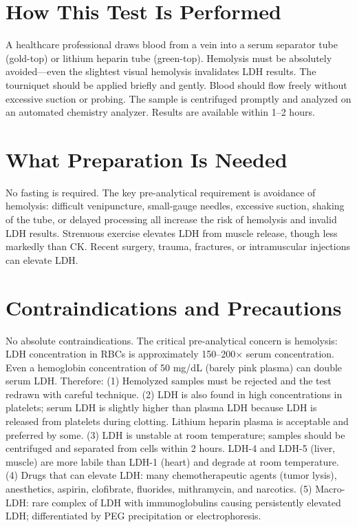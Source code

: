 \section*{How This Test Is Performed}
A healthcare professional draws blood from a vein into a serum separator tube (gold-top) or lithium heparin tube (green-top). Hemolysis must be absolutely avoided---even the slightest visual hemolysis invalidates LDH results. The tourniquet should be applied briefly and gently. Blood should flow freely without excessive suction or probing. The sample is centrifuged promptly and analyzed on an automated chemistry analyzer. Results are available within 1--2 hours.

\section*{What Preparation Is Needed}
No fasting is required. The key pre-analytical requirement is avoidance of hemolysis: difficult venipuncture, small-gauge needles, excessive suction, shaking of the tube, or delayed processing all increase the risk of hemolysis and invalid LDH results. Strenuous exercise elevates LDH from muscle release, though less markedly than CK. Recent surgery, trauma, fractures, or intramuscular injections can elevate LDH.

\section*{Contraindications and Precautions}
No absolute contraindications. The critical pre-analytical concern is hemolysis: LDH concentration in RBCs is approximately 150--200$\times$ serum concentration. Even a hemoglobin concentration of 50 mg/dL (barely pink plasma) can double serum LDH. Therefore: (1) Hemolyzed samples must be rejected and the test redrawn with careful technique. (2) LDH is also found in high concentrations in platelets; serum LDH is slightly higher than plasma LDH because LDH is released from platelets during clotting. Lithium heparin plasma is acceptable and preferred by some. (3) LDH is unstable at room temperature; samples should be centrifuged and separated from cells within 2 hours. LDH-4 and LDH-5 (liver, muscle) are more labile than LDH-1 (heart) and degrade at room temperature. (4) Drugs that can elevate LDH: many chemotherapeutic agents (tumor lysis), anesthetics, aspirin, clofibrate, fluorides, mithramycin, and narcotics. (5) Macro-LDH: rare complex of LDH with immunoglobulins causing persistently elevated LDH; differentiated by PEG precipitation or electrophoresis.

